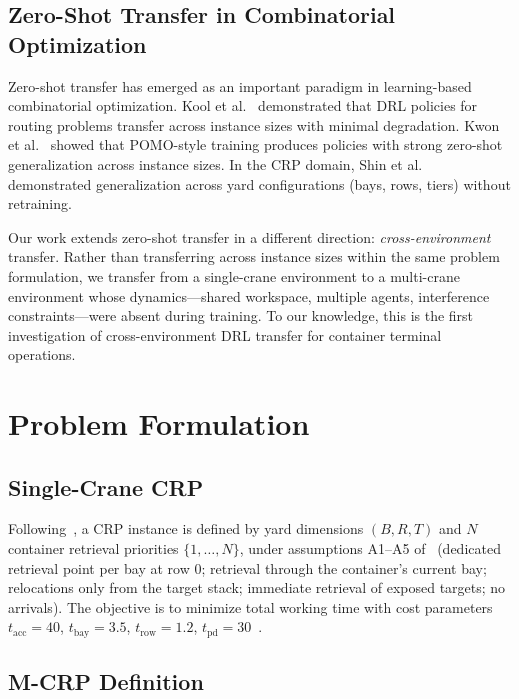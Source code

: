 \documentclass[11pt,a4paper]{elsarticle}
\begin{document}
\subsection{Zero-Shot Transfer in Combinatorial Optimization}

Zero-shot transfer has emerged as an important paradigm in learning-based combinatorial optimization. Kool et al.~\cite{kool2019} demonstrated that DRL policies for routing problems transfer across instance sizes with minimal degradation. Kwon et al.~\cite{kwon2020} showed that POMO-style training produces policies with strong zero-shot generalization across instance sizes. In the CRP domain, Shin et al.~\cite{shin2026} demonstrated generalization across yard configurations (bays, rows, tiers) without retraining.

Our work extends zero-shot transfer in a different direction: \emph{cross-environment} transfer. Rather than transferring across instance sizes within the same problem formulation, we transfer from a single-crane environment to a multi-crane environment whose dynamics---shared workspace, multiple agents, interference constraints---were absent during training. To our knowledge, this is the first investigation of cross-environment DRL transfer for container terminal operations.

\section{Problem Formulation}
\label{sec:problem}

\subsection{Single-Crane CRP}

Following~\cite{shin2026}, a CRP instance is defined by yard dimensions $(B,R,T)$ and $N$ container retrieval priorities $\{1,\dots,N\}$, under assumptions A1--A5 of~\cite{shin2026} (dedicated retrieval point per bay at row 0; retrieval through the container's current bay; relocations only from the target stack; immediate retrieval of exposed targets; no arrivals). The objective is to minimize total working time with cost parameters $t_{\text{acc}}=40$, $t_{\text{bay}}=3.5$, $t_{\text{row}}=1.2$, $t_{\text{pd}}=30$~\cite{shin2026}.

\subsection{M-CRP Definition}
\end{document}
